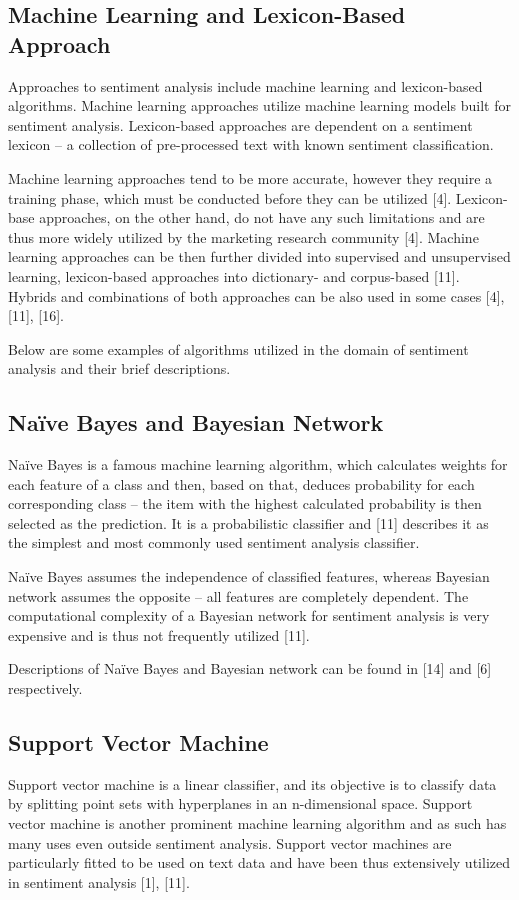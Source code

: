 \documentclass[12pt,journal,compsoc]{IEEEtran}
\begin{document}
\subsection{Machine Learning and Lexicon-Based Approach}
Approaches to sentiment analysis include machine learning and lexicon-based algorithms. Machine learning approaches utilize machine learning models built for sentiment analysis. Lexicon-based approaches are dependent on a sentiment lexicon – a collection of pre-processed text with known sentiment classification.

Machine learning approaches tend to be more accurate, however they require a training phase, which must be conducted before they can be utilized [4]. Lexicon-base approaches, on the other hand, do not have any such limitations and are thus more widely utilized by the marketing research community [4]. Machine learning approaches can be then further divided into supervised and unsupervised learning, lexicon-based approaches into dictionary- and corpus-based [11]. Hybrids and combinations of both approaches can be also used in some cases [4], [11], [16].

Below are some examples of algorithms utilized in the domain of sentiment analysis and their brief descriptions.

\subsection{Naïve Bayes and Bayesian Network}
Naïve Bayes is a famous machine learning algorithm, which calculates weights for each feature of a class and then, based on that, deduces probability for each corresponding class – the item with the highest calculated probability is then selected as the prediction. It is a probabilistic classifier and [11] describes it as the simplest and most commonly used sentiment analysis classifier.

Naïve Bayes assumes the independence of classified features, whereas Bayesian network assumes the opposite – all features are completely dependent. The computational complexity of a Bayesian network for sentiment analysis is very expensive and is thus not frequently utilized [11].

Descriptions of Naïve Bayes and Bayesian network can be found in [14] and [6] respectively.

\subsection{Support Vector Machine}
Support vector machine is a linear classifier, and its objective is to classify data by splitting point sets with hyperplanes in an n-dimensional space. Support vector machine is another prominent machine learning algorithm and as such has many uses even outside sentiment analysis. Support vector machines are particularly fitted to be used on text data and have been thus extensively utilized in sentiment analysis [1], [11].
\end{document}

